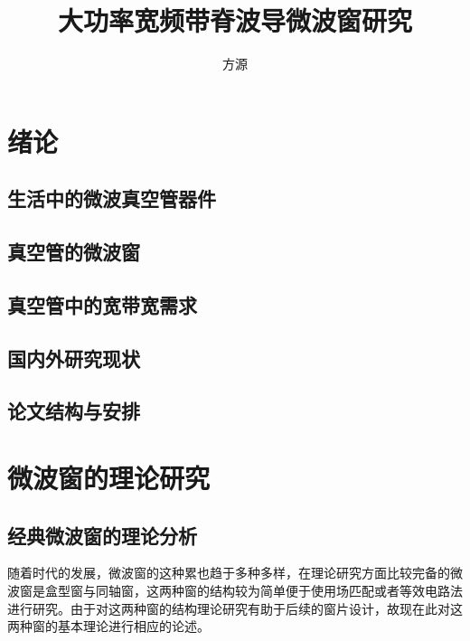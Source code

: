 \documentclass[master]{thesis-uestc}
\title{大功率宽频带脊波导微波窗研究}{English Title} %
\author{方源}{English Name} %
\begin{document}
\makecover %
\originalitydeclaration %
\begin{chineseabstract}

\end{chineseabstract}
\begin{englishabstract}

\end{englishabstract}

\thesistableofcontents %
\thesisfigurelist %
\thesistablelist %
\thesisglossarylist %
\thesissymbollist %



\chapter{绪\hspace{6pt}论}
\section{生活中的微波真空管器件}
\section{真空管的微波窗}
\section{真空管中的宽带宽需求}
\section{国内外研究现状}

\section{论文结构与安排}
\chapter{微波窗的理论研究}
\section{经典微波窗的理论分析}
随着时代的发展，微波窗的这种累也趋于多种多样，在理论研究方面比较完备的微波窗是盒型窗与同轴窗，这两种窗的结构较为简单便于使用场匹配或者等效电路法进行研究。由于对这两种窗的结构理论研究有助于后续的窗片设计，故现在此对这两种窗的基本理论进行相应的论述。
\end{document}
